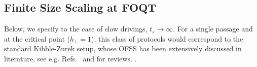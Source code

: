 \subsection{Finite Size Scaling at FOQT}

Below, we specify to the case of slow drivings, $t_s\to\infty$. For a single passage and at the critical point ($h_\perp=1$), this class of protocols would correspond to the standard Kibble-Zurek setup, whose OFSS has been extensively discussed in literature, see e.g. Refs.~\cite{dziarmaga2005dynamics,polkovnikov2005universal,zurek2005dynamics,collura2010critical,liu2020kibble,cui2020experimentally,mukherjee2020universal,zeng2023universal,dutta2016anti,sadhukhan2020sonic,ulm2013observation,weiler2008spontaneous,pyka2013symmetry,navon2016emergence} and \cite{dziarmaga2010dynamics,rossini2021coherent} for reviews. . 
\\

